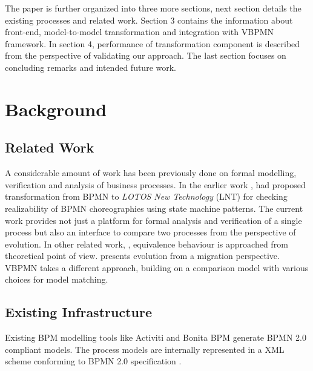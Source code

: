 \documentclass{article}
\begin{document}
The paper is further organized into three more sections, next section details the existing processes and related work. Section 3 contains the information about front-end, model-to-model transformation and integration with 
VBPMN framework. In section 4, performance of transformation component is described from the perspective of validating our approach. The last section focuses on concluding remarks and intended future work.

\section{Background}
\subsection{Related Work}
A considerable amount of work has been previously done on formal modelling, verification and analysis of business processes. In the earlier work \cite{Choreo:Ref}, had proposed transformation from BPMN to \textit{LOTOS New Technology} (LNT) \cite{LNT:Ref} for checking realizability of  BPMN choreographies using state machine patterns. The current work provides not just a platform for formal analysis and verification of a single process but also an interface to compare two processes from the perspective of evolution. In other related work, \cite{Lam:Ref}, equivalence behaviour is approached from theoretical point of view. \cite{Boud:Ref} presents evolution from a migration perspective. VBPMN takes a different approach, building on a comparison model with various choices for model matching.

\subsection{Existing Infrastructure}
Existing BPM modelling tools like Activiti and Bonita BPM generate BPMN 2.0 compliant models. The process models are internally represented in a XML scheme conforming to BPMN 2.0 specification \cite{omg2011bpmn}. 
\end{document}
